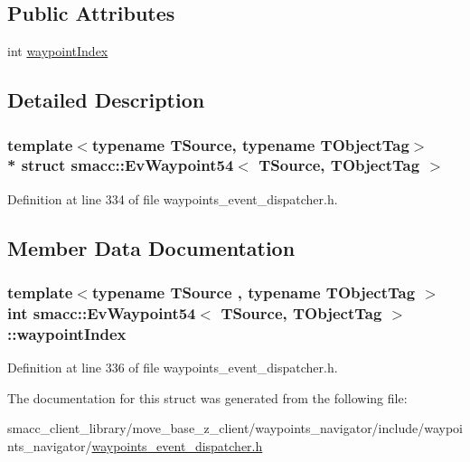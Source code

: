 \subsection*{Public Attributes}
\begin{DoxyCompactItemize}
\item 
int \hyperlink{structsmacc_1_1EvWaypoint54_a7c161b0b2166e95393b5cb9d009a2570}{waypoint\+Index}
\end{DoxyCompactItemize}


\subsection{Detailed Description}
\subsubsection*{template$<$typename T\+Source, typename T\+Object\+Tag$>$\\*
struct smacc\+::\+Ev\+Waypoint54$<$ T\+Source, T\+Object\+Tag $>$}



Definition at line 334 of file waypoints\+\_\+event\+\_\+dispatcher.\+h.



\subsection{Member Data Documentation}
\subsubsection[{\texorpdfstring{waypoint\+Index}{waypointIndex}}]{\setlength{\rightskip}{0pt plus 5cm}template$<$typename T\+Source , typename T\+Object\+Tag $>$ int {\bf smacc\+::\+Ev\+Waypoint54}$<$ T\+Source, T\+Object\+Tag $>$\+::waypoint\+Index}\hypertarget{structsmacc_1_1EvWaypoint54_a7c161b0b2166e95393b5cb9d009a2570}{}\label{structsmacc_1_1EvWaypoint54_a7c161b0b2166e95393b5cb9d009a2570}


Definition at line 336 of file waypoints\+\_\+event\+\_\+dispatcher.\+h.



The documentation for this struct was generated from the following file\+:\begin{DoxyCompactItemize}
\item 
smacc\+\_\+client\+\_\+library/move\+\_\+base\+\_\+z\+\_\+client/waypoints\+\_\+navigator/include/waypoints\+\_\+navigator/\hyperlink{waypoints__event__dispatcher_8h}{waypoints\+\_\+event\+\_\+dispatcher.\+h}\end{DoxyCompactItemize}
